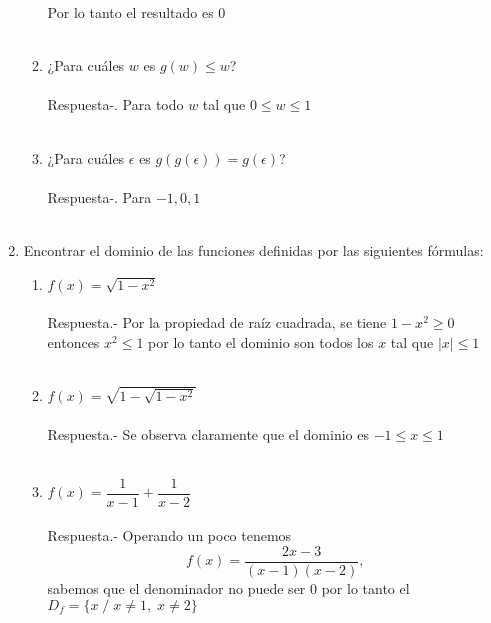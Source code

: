 \begin{enumerate}[\bfseries 1.]
\begin{enumerate}[\bfseries (i)]
	    Por lo tanto el resultado es $0$\\\\

	    \item ¿Para cuáles $w$ es $g(w)\leq w $?\\\\
	    Respuesta-. \; Para todo $w$ tal que $0\leq w\leq 1$\\\\

	    \item ¿Para cuáles $\epsilon$ es $g(g(\epsilon)) = g(\epsilon)$?\\\\
	    Respuesta-. \; Para $-1,0,1$\\\\ 

	\end{enumerate}

	\item Encontrar el dominio de las funciones definidas por las siguientes fórmulas:
	    \begin{enumerate}[\bfseries (i)]

	    \item $f(x)=\sqrt{1-x^2}$\\\\
	    Respuesta.- \; Por la propiedad de raíz cuadrada, se tiene  $1-x^2 \geq 0$ entonces $x^2 \leq 1$ por lo tanto el dominio son todos los $x$ tal que $|x| \leq 1$\\\\

	    \item $f(x)=\sqrt{1-\sqrt{1-x^2}}$\\\\
	    Respuesta.- \; Se observa claramente que el dominio es $-1\leq x \leq 1$\\\\

	    \item $f(x)=\dfrac{1}{x-1} + \dfrac{1}{x-2}$\\\\
	    Respuesta.- \; Operando un poco tenemos $$f(x) = \dfrac{2x-3}{(x-1)(x-2)},$$ sabemos que el denominador no puede ser $0$ por lo tanto el $D_{f} = \lbrace x\; / \; x \neq 1, \; x\neq  2 \rbrace$\\\\ 
    

\end{enumerate}
\end{enumerate}
